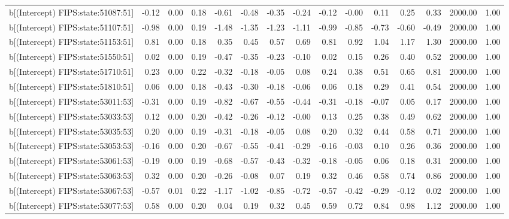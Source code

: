 \begin{table}[ht]
\begin{tabular}{rrrrrrrrrrrrrrr}
  b[(Intercept) FIPS:state:51087:51] & -0.12 & 0.00 & 0.18 & -0.61 & -0.48 & -0.35 & -0.24 & -0.12 & -0.00 & 0.11 & 0.25 & 0.33 & 2000.00 & 1.00 \\ 
  b[(Intercept) FIPS:state:51107:51] & -0.98 & 0.00 & 0.19 & -1.48 & -1.35 & -1.23 & -1.11 & -0.99 & -0.85 & -0.73 & -0.60 & -0.49 & 2000.00 & 1.00 \\ 
  b[(Intercept) FIPS:state:51153:51] & 0.81 & 0.00 & 0.18 & 0.35 & 0.45 & 0.57 & 0.69 & 0.81 & 0.92 & 1.04 & 1.17 & 1.30 & 2000.00 & 1.00 \\ 
  b[(Intercept) FIPS:state:51550:51] & 0.02 & 0.00 & 0.19 & -0.47 & -0.35 & -0.23 & -0.10 & 0.02 & 0.15 & 0.26 & 0.40 & 0.52 & 2000.00 & 1.00 \\ 
  b[(Intercept) FIPS:state:51710:51] & 0.23 & 0.00 & 0.22 & -0.32 & -0.18 & -0.05 & 0.08 & 0.24 & 0.38 & 0.51 & 0.65 & 0.81 & 2000.00 & 1.00 \\ 
  b[(Intercept) FIPS:state:51810:51] & 0.06 & 0.00 & 0.18 & -0.43 & -0.30 & -0.18 & -0.06 & 0.06 & 0.18 & 0.29 & 0.41 & 0.54 & 2000.00 & 1.00 \\ 
  b[(Intercept) FIPS:state:53011:53] & -0.31 & 0.00 & 0.19 & -0.82 & -0.67 & -0.55 & -0.44 & -0.31 & -0.18 & -0.07 & 0.05 & 0.17 & 2000.00 & 1.00 \\ 
  b[(Intercept) FIPS:state:53033:53] & 0.12 & 0.00 & 0.20 & -0.42 & -0.26 & -0.12 & -0.00 & 0.13 & 0.25 & 0.38 & 0.49 & 0.62 & 2000.00 & 1.00 \\ 
  b[(Intercept) FIPS:state:53035:53] & 0.20 & 0.00 & 0.19 & -0.31 & -0.18 & -0.05 & 0.08 & 0.20 & 0.32 & 0.44 & 0.58 & 0.71 & 2000.00 & 1.00 \\ 
  b[(Intercept) FIPS:state:53053:53] & -0.16 & 0.00 & 0.20 & -0.67 & -0.55 & -0.41 & -0.29 & -0.16 & -0.03 & 0.10 & 0.26 & 0.36 & 2000.00 & 1.00 \\ 
  b[(Intercept) FIPS:state:53061:53] & -0.19 & 0.00 & 0.19 & -0.68 & -0.57 & -0.43 & -0.32 & -0.18 & -0.05 & 0.06 & 0.18 & 0.31 & 2000.00 & 1.00 \\ 
  b[(Intercept) FIPS:state:53063:53] & 0.32 & 0.00 & 0.20 & -0.26 & -0.08 & 0.07 & 0.19 & 0.32 & 0.46 & 0.58 & 0.74 & 0.86 & 2000.00 & 1.00 \\ 
  b[(Intercept) FIPS:state:53067:53] & -0.57 & 0.01 & 0.22 & -1.17 & -1.02 & -0.85 & -0.72 & -0.57 & -0.42 & -0.29 & -0.12 & 0.02 & 2000.00 & 1.00 \\ 
  b[(Intercept) FIPS:state:53077:53] & 0.58 & 0.00 & 0.20 & 0.04 & 0.19 & 0.32 & 0.45 & 0.59 & 0.72 & 0.84 & 0.98 & 1.12 & 2000.00 & 1.00 \\ 

\end{tabular}
\end{table}
